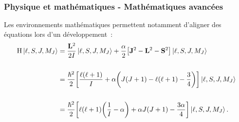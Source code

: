 \begin{frame}
  \frametitle{Physique et mathématiques - Mathématiques avancées}
  Les environnements mathématiques permettent notamment d'aligner des équations lors d'un développement~:
    \begin{align*}
        \mathrm{H}\ket{\ell, S, J, M_J} &= \frac{\vb{L}^2}{2I}\ket{\ell, S, J, M_J} + \frac{\alpha}{2}\qty[\vb{J}^2 - \vb{L}^2 - \vb{S}^2]\ket{\ell, S, J, M_J} \\\\
        &= \frac{\hbar^2}{2}\qty[\frac{\ell(\ell + 1)}{I} + \alpha\qty(J(J + 1) - \ell(\ell + 1) - \frac{3}{4})]\ket{\ell, S, J, M_J} \\\\
        &= \frac{\hbar^2}{2}\qty[\ell(\ell + 1)\qty(\frac{1}{I} - \alpha) + \alpha J(J + 1) - \frac{3\alpha}{4}]\ket{\ell, S, J, M_J}.
    \end{align*}
\end{frame}
